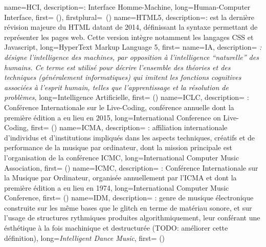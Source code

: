 {
    name={HCI},
    description={\textit{}: Interface Homme-Machine},
    long={Human-Computer Interface},
    first={ ()},
    firstplural={\glspluralsuffix\ (\glspluralsuffix)}
}
{
    name={HTML5},
    description={\textit{}: est la dernière révision majeure du HTML datant de 2014, définissant la syntaxe permettant de représenter les pages web. Cette version intègre notamment les langages CSS et Javascript},
    long={HyperText Markup Language 5},
    first={}
}
{
    name={IA},
    description={\textit{ : désigne l'intelligence des machines, par opposition à l'intelligence ``naturelle'' des humains. Ce terme est utilisé pour décrire l'ensemble des théories et des techniques (généralement informatiques) qui imitent les fonctions cognitives associées à l'esprit humain, telles que l'apprentissage et la résolution de problèmes}},
    long={Intelligence Artificielle},
    first={ ()}
}
{
    name={ICLC},
    description={\textit{} : Conférence Internationale sur le Live-Coding, conférence annuelle dont la première édition a eu lieu en 2015},
    long={International Conference on Live-Coding},
    first={ ()}
}
{
    name={ICMA},
    description={\textit{} : affiliation internationale d'individus et d'institutions impliqués dans les aspects techniques, créatifs et de performance de la musique par ordinateur, dont la mission principale est l'organisation de la conférence \gls{ICMC}},
    long={International Computer Music Association},
    first={ ()}
}
{
    name={ICMC},
    description={\textit{} : Conférence Internationale sur la Musique par Ordinateur, organisée annuellement par l'\gls{ICMA} et dont la première édition a eu lieu en 1974},
    long={International Computer Music Conference},
    first={ ()}
}
{
    name={IDM},
    description={\textit{} : genre de musique électronique construite sur les même bases que le \gls{glitch} en terme de matériau sonore, et sur l'usage de structures rythmiques produites algorithmiquement, leur conférant une ésthétique à la fois machinique et destructurée (TODO: améliorer cette définition)},
    long={\textit{Intelligent Dance Music}},
    first={ ()}
}
